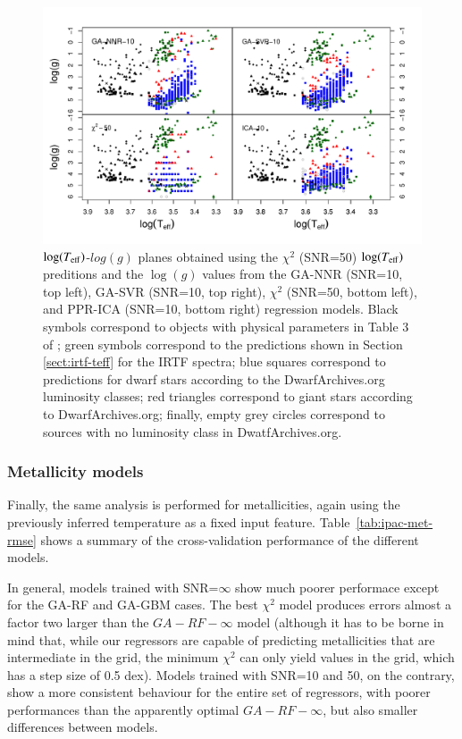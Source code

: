 \begin{figure}
 \begin{center}
 \includegraphics[width=\textwidth]{figs/ipac-teff-logg.pdf}

\caption{$\log(T_{\rm eff})$-$log(g)$ planes obtained using the $\chi^2$ (SNR=50)
$\log(T_{\rm eff})$ preditions and the $\log(g)$ values from the
GA-NNR (SNR=10, top left), GA-SVR (SNR=10, top right), $\chi^2$
(SNR=50, bottom left), and PPR-ICA (SNR=10, bottom right) regression
models. Black symbols correspond to objects with physical parameters
in Table 3 of \protect\cite{cesetti}; green symbols correspond to the
predictions shown in Section \ref{sect:irtf-teff} for the IRTF
spectra; blue squares correspond to predictions for dwarf stars
according to the DwarfArchives.org luminosity classes; red triangles
correspond to giant stars according to DwarfArchives.org; finally,
empty grey circles correspond to sources with no luminosity class in
DwatfArchives.org.}

\label{fig:teffvsloggIPAC}
 \end{center}
\end{figure}

\subsubsection{Metallicity models} 

Finally, the same analysis is performed for metallicities, again using
the previously inferred temperature as a fixed input feature.
Table~\ref{tab:ipac-met-rmse} shows a summary of the cross-validation
performance of the different models.

In general, models trained with SNR=$\infty$ show much poorer 
performace except for the GA-RF and GA-GBM cases. The best $\chi^2$ 
model produces errors almost a factor two larger than the 
$GA-RF-\infty$ model (although it has to be borne in mind that, while 
our regressors are capable of predicting metallicities that are 
intermediate in the grid, the minimum $\chi^2$ can only yield values 
in the grid, which has a step size of 0.5 dex). Models trained with 
SNR=10 and 50, on the contrary,  show a more consistent behaviour for 
the entire set of regressors, with poorer performances than the 
apparently optimal $GA-RF-\infty$, but also smaller differences between models. 

